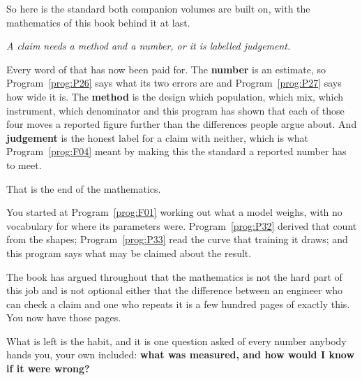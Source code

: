 \begin{fr}
So here is the standard both companion volumes are built on, with the
mathematics of this book behind it at last.

\begin{center}
\emph{A claim needs a method and a number, or it is labelled judgement.}
\end{center}

Every word of that has now been paid for. The \textbf{number} is an estimate,
so Program~\ref{prog:P26} says what its two errors are and
Program~\ref{prog:P27} says how wide it is. The \textbf{method} is the design
\dash{} which population, which mix, which instrument, which denominator
\dash{} and this program has shown that each of those four moves a reported
figure further than the differences people argue about. And
\textbf{judgement} is the honest label for a claim with neither, which is
what Program~\ref{prog:F04} meant by making this the standard a reported
number has to meet.
\end{fr}

\begin{fr}
That is the end of the mathematics.

You started at Program~\ref{prog:F01} working out what a model weighs, with
no vocabulary for where its parameters were. Program~\ref{prog:P32} derived
that count from the shapes; Program~\ref{prog:P33} read the curve that
training it draws; and this program says what may be claimed about the
result.

The book has argued throughout that the mathematics is not the hard part of
this job and is not optional either \dash{} that the difference between an
engineer who can check a claim and one who repeats it is a few hundred pages
of exactly this. You now have those pages.

What is left is the habit, and it is one question asked of every number
anybody hands you, your own included: \textbf{what was measured, and how
would I know if it were wrong?}
\end{fr}

